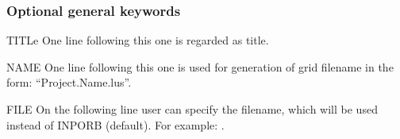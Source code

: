 \subsubsection{Optional general keywords}
\begin{keywordlist}
\item[TITLe]
One line following this one is regarded as title.
\item[NAME]
One line following this one is used for generation of
grid filename in the form: ``Project.Name.lus''.
\item[FILE]
On the following line user can specify the filename, which will be
used instead of INPORB (default). For example: .


\end{keywordlist}
